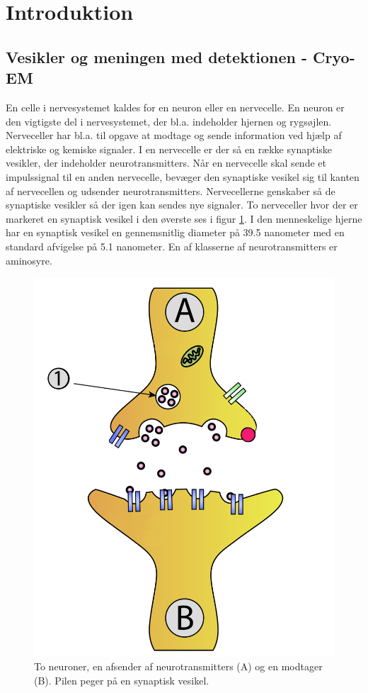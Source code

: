 \section{Introduktion} %
\subsection{Vesikler og meningen med detektionen - Cryo-EM} %
En celle i nervesystemet kaldes for en neuron eller en nervecelle. En neuron er den vigtigste del i nervesystemet, der bl.a. indeholder hjernen og rygsøjlen. Nerveceller har bl.a. til opgave at modtage og sende information ved hjælp af elektriske og kemiske signaler. I en nervecelle er der så en række synaptiske vesikler, der indeholder neurotransmitters. Når en nervecelle skal sende et impulssignal til en anden nervecelle, bevæger den synaptiske vesikel sig til kanten af nervecellen og udsender neurotransmitters. Nervecellerne genskaber så de synaptiske vesikler så der igen kan sendes nye signaler. To nerveceller hvor der er markeret en synaptisk vesikel i den øverste ses i figur \ref{fig:intro_syntrans}. I den menneskelige hjerne har en synaptisk vesikel en gennemsnitlig diameter på 39.5 nanometer med en standard afvigelse på 5.1 nanometer. En af klasserne af neurotransmitters er aminosyre.  

\begin{figure}[H]
	\centering
	\includegraphics[scale=0.2]{files/intro/img/synTransmitter.png}
	\caption{To neuroner, en afsender af neurotransmitters (A) og en modtager (B). Pilen peger på en synaptisk vesikel.\label{fig:intro_syntrans}}
\end{figure} 


